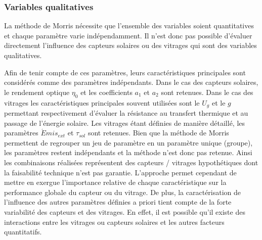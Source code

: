 \subsubsection{Variables qualitatives} %
\label{ssub:variables_qualitatives}
La méthode de Morris nécessite que l’ensemble des variables soient quantitatives et chaque
paramètre varie indépendamment. Il n’est donc pas possible d’évaluer directement
l’influence des capteurs solaires ou des vitrages qui sont des variables qualitatives.

Afin de tenir compte de ces paramètres, leurs caractéristiques principales sont considérés
comme des paramètres indépendants. Dans le cas des capteurs solaires, le rendement optique
$\eta_{0}$ et les coefficients $a_{1}$ et $a_{2}$ sont retenues. Dans le cas des vitrages
les caractéristiques principales souvent utilisées sont le $U_{g}$ et le $g$ permettant
respectivement d’évaluer la résistance au transfert thermique et au passage de l’énergie
solaire. Les vitrages étant définies de manière détaillé, les paramètres $\acute Emis_{ext}$
et $\tau_{sol}$ sont retenues. Bien que la méthode de Morris permettent de
regrouper un jeu de paramètre en un paramètre unique (groupe), les paramètres restent
indépendants et la méthode n’est donc pas retenue. Ainsi les combinaisons réalisées
représentent des capteurs / vitrages hypothétiques dont la faisabilité technique n’est pas
garantie. L’approche permet cependant de mettre en exergue l’importance relative de chaque
caractéristique sur la performance globale du capteur ou du vitrage. De plus, la
caractérisation de l’influence des autres paramètres définies a priori tient compte de la
forte variabilité des capteurs et des vitrages. En effet, il est possible qu’il existe des
interactions entre les vitrages ou capteurs solaires et les autres facteurs quantitatifs.



